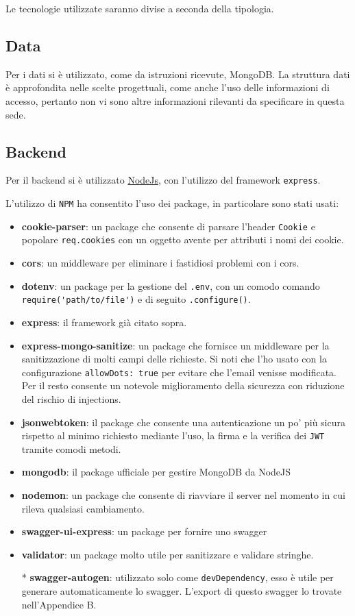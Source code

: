 Le tecnologie utilizzate saranno divise a seconda della tipologia.
\subsection{Data}
Per i dati si è utilizzato, come da istruzioni ricevute, MongoDB. La struttura dati è approfondita nelle scelte progettuali, come anche l'uso delle informazioni di accesso, pertanto non vi sono altre informazioni rilevanti da specificare in questa sede.
\subsection{Backend}
Per il backend si è utilizzato \href{https://nodejs.org/en/about}{NodeJs}, con l'utilizzo del framework \verb|express|\cite{express}.

L'utilizzo di \verb|NPM| ha consentito l'uso dei package, in particolare sono stati usati:
\begin{itemize}
    \item \textbf{cookie-parser}: un package che consente di parsare l'header \verb|Cookie| e popolare \verb|req.cookies| con un oggetto avente per attributi i nomi dei cookie\cite{cookie-parser}.
    \item \textbf{cors}: un middleware per eliminare i fastidiosi problemi con i cors\cite{cors}.
    \item \textbf{dotenv}: un package per la gestione del \verb|.env|, con un comodo comando \verb|require('path/to/file')| e di seguito \verb|.configure()|\cite{dotenv}.
    \item \textbf{express}: il framework già citato sopra.
    \item \textbf{express-mongo-sanitize}: un package che fornisce un middleware per la sanitizzazione di molti campi delle richieste. Si noti che l'ho usato con la configurazione \verb|allowDots: true| per evitare che l'email venisse modificata. Per il resto consente un notevole miglioramento della sicurezza con riduzione del rischio di injections\cite{express-mongo-sanitize}.
    \item \textbf{jsonwebtoken}: il package che consente una autenticazione un po' più sicura rispetto al minimo richiesto mediante l'uso, la firma e la verifica dei \verb|JWT| tramite comodi metodi\cite{jsonwebtoken}.
    \item \textbf{mongodb}: il package ufficiale per gestire MongoDB da NodeJS\cite{mongodb-npm}
    \item \textbf{nodemon}: un package che consente di riavviare il server nel momento in cui rileva qualsiasi cambiamento\cite{nodemon}.
    \item \textbf{swagger-ui-express}: un package per fornire uno swagger\cite{swagger-ui-express}
    \item \textbf{validator}: un package molto utile per sanitizzare e validare stringhe\cite{validator}.
    \item[*] \textbf{swagger-autogen}: utilizzato solo come \verb|devDependency|, esso è utile per generare automaticamente lo swagger\cite{swagger-autogen}. L'export di questo swagger lo trovate nell'Appendice B.
\end{itemize}
